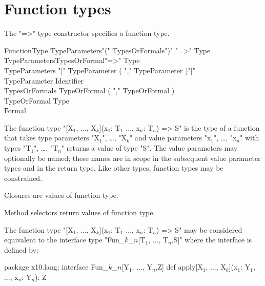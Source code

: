 \section{Function types}
\label{FunctionTypes}

The \xcd"=>" type constructor specifies a function type.

\begin{grammar}
FunctionType \: TypeParameters\opt \xcd"(" TypesOrFormals\opt \xcd")" \xcd"=>" Type  \\
             \| TypeParameters\opt TypesOrFormal\opt \xcd"=>" Type  \\
TypeParameters \: \xcd"[" TypeParameter ( \xcd"," TypeParameter )\star \xcd"]" \\
TypeParameter \: Identifier \\
TypesOrFormals \: TypeOrFormal ( \xcd"," TypeOrFormal )\star \\
TypeOrFormal   \: Type \\
               \| Formal \\
\end{grammar}

The function type
\xcdmath"[X$_1$, $\dots$, X$_k$](x$_1$: T$_1$ $\dots$, x$_n$: T$_n$) => S"
is the type of a function that takes type parameters
\xcdmath"X$_1$", \dots, \xcdmath"X$_k$"
and value parameters
\xcdmath"x$_1$", \dots, \xcdmath"x$_n$"
with types
\xcdmath"T$_1$", \dots, \xcdmath"T$_n$"
returns a value of type \xcd"S".  The value parameters may
optionally be named; these names are in scope in the subsequent
value parameter types and in the return type.
Like other types, function types may be constrained.

Closures are values of function type.

Method selectors return values of function type.

The function type
\xcdmath"[X$_1$, $\dots$, X$_k$](x$_1$: T$_1$ $\dots$, x$_n$: T$_n$) => S"
may be considered equivalent to the interface type
\xcdmath"Fun_$k$_$n$[T$_1$, $\dots$, T$_n$,S]"
where the interface is defined by:
\begin{xtenmath}
package x10.lang;
interface Fun_$k$_$n$[Y$_1$, $\dots$, Y$_n$,Z] {
    def apply[X$_1$, $\dots$, X$_k$](x$_1$: Y$_1$, $\dots$, x$_n$: Y$_n$): Z
}
\end{xtenmath}

